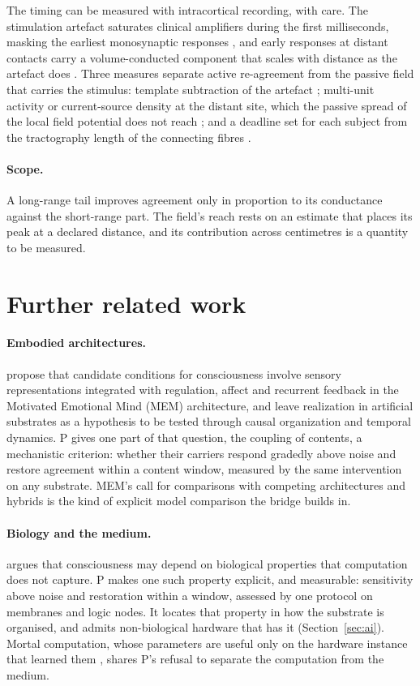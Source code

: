\documentclass[12pt]{article}
\begin{document}
The timing can be measured with intracortical recording, with care. The
stimulation artefact saturates clinical amplifiers during the first
milliseconds, masking the earliest monosynaptic responses \citep{keller2014},
and early responses at distant contacts carry a volume-conducted component that
scales with distance as the artefact does \citep{prime2020}. Three measures
separate active re-agreement from the passive field that carries the stimulus:
template subtraction of the artefact \citep{trebaul2016}; multi-unit activity or
current-source density at the distant site, which the passive spread of the
local field potential does not reach \citep{kajikawa2011}; and a deadline set
for each subject from the tractography length of the connecting fibres
\citep{caminiti2013}.

\paragraph{Scope.} A long-range tail improves agreement only in proportion
to its conductance against the short-range part. The field's reach rests on an
estimate that places its peak at a declared distance, and its contribution
across centimetres is a quantity to be measured.

\section{Further related work}
\label{app:related}

\paragraph{Embodied architectures.} \citet{starzyk2026} propose that candidate
conditions for consciousness involve sensory representations integrated with
regulation, affect and recurrent feedback in the Motivated Emotional Mind
(MEM) architecture, and leave realization in artificial substrates as a
hypothesis to be tested through causal organization and temporal dynamics. P
gives one part of that question, the coupling of contents, a mechanistic
criterion: whether their carriers respond gradedly above noise and restore
agreement within a content window, measured by the same intervention on any
substrate. MEM's call for comparisons with competing architectures and hybrids
is the kind of explicit model comparison the bridge builds in.

\paragraph{Biology and the medium.} \citet{seth2026} argues that consciousness
may depend on biological properties that computation does not capture. P makes
one such property explicit, and measurable: sensitivity above noise and
restoration within a window, assessed by one protocol on membranes and logic
nodes. It locates that property in how the substrate is organised, and admits
non-biological hardware that has it (Section~\ref{sec:ai}). Mortal computation,
whose parameters are useful only on the hardware instance that learned them
\citep{hinton2022,ororbia2023}, shares P's refusal to separate the computation
from the medium.
\end{document}
